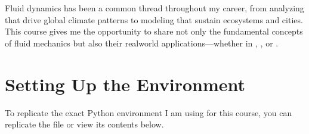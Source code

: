 \documentclass[letterpaper,10pt,english]{jupyterBook}
\begin{document}
\sphinxAtStartPar
Fluid dynamics has been a common thread throughout my career, from analyzing  that drive global climate patterns to modeling  that sustain ecosystems and cities. This course gives me the opportunity to share not only the fundamental concepts of fluid mechanics but also their real\sphinxhyphen{}world applications—whether in , , or .

\sphinxstepscope


\chapter{Setting Up the Environment}
\label{\detokenize{environment:setting-up-the-environment}}\label{\detokenize{environment::doc}}
\sphinxAtStartPar
To replicate the exact Python environment I am using for this course, you can replicate the  file or view its contents below.
\end{document}
